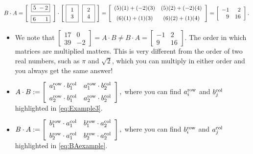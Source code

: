 \begin{equation}
\label{eq:BAexample}
   B \cdot A= \left[\begin{array}{c}\boxed{ 5 ~-2} \medskip\\
\boxed{6 ~~~~~ 1 }\end{array}\right]  \cdot \left[~\boxed{\begin{array}{c} 1 \\ 3\end{array} }~~\boxed{\begin{array}{r} 2 \\ 4\end{array} }~ \right] =\left[\begin{array}{cc} (5)(1)+(-2)(3) & (5)(2)+(-2)(4) \medskip \\
(6)(1)+(1)(3) & (6)(2)+(1)(4)  \end{array}\right]  =\left[\begin{array}{rr} -1 & 2 \\
9 & 16  \end{array}\right].
\end{equation}

\Qed

\begin{tcolorbox}[sharp corners, colback=green!30, colframe=green!80!blue, title=\textbf{\Large Order Matters When Multiplying Matrices}]

\begin{itemize}
    \item We note that $\left[\begin{array}{rr} 17 & 0 \\
39 & -2  \end{array}\right]= A \cdot B \neq B \cdot A = \left[\begin{array}{rr} -1 & 2 \\
9 & 16  \end{array}\right]$. The order in which matrices are multiplied matters. This is very different from the order of two real numbers, such as $\pi$ and $\sqrt{2}$, which you can multiply in either order and you always get the same answer!
    \item $A\cdot B:= \left[\begin{array}{cc} a_1^{\rm row} \cdot b_1^{\rm col} & a_1^{\rm row}\cdot  b_2^{\rm col}  \medskip \\
    a_2^{\rm row} \cdot b_1^{\rm col} & a_2^{\rm row} \cdot b_2^{\rm col}
\end{array}\right],$  where you can find $a_i^{\rm row} $ and $ b_j^{\rm col}$ highlighted in \eqref{eq:Example3}.
    \item $B\cdot A:= \left[\begin{array}{cc}  b_1^{\rm row}  \cdot a_1^{\rm col} & b_1^{\rm row}  \cdot a_2^{\rm col}  \medskip \\
    b_2^{\rm row}  \cdot a_1^{\rm col} & b_2^{\rm row}  \cdot a_2^{\rm col}
\end{array}\right],$ where you can find $b_i^{\rm row} $ and $ a_j^{\rm col}$ highlighted in \eqref{eq:BAexample}.
\end{itemize}

\end{tcolorbox}

